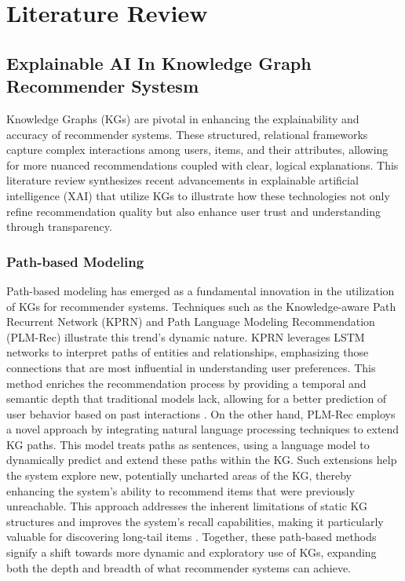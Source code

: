 \chapter{Literature Review}
\label{chap:literature_review}

\section{Explainable AI In Knowledge Graph Recommender Systesm}

Knowledge Graphs (KGs) are pivotal in enhancing the explainability and accuracy of
recommender systems. These structured, relational frameworks capture complex interactions
among users, items, and their attributes, allowing for more nuanced
recommendations coupled with clear, logical explanations. This literature review
synthesizes recent advancements in explainable artificial intelligence (XAI)
that utilize KGs to illustrate how these technologies not only refine
recommendation quality but also enhance user trust and understanding through
transparency.

\subsection{Path-based Modeling}

Path-based modeling has emerged as a fundamental innovation in the utilization of
KGs for recommender systems. Techniques such as the Knowledge-aware Path
Recurrent Network (KPRN) and Path Language Modeling Recommendation (PLM-Rec)
illustrate this trend's dynamic nature. KPRN leverages LSTM networks to interpret
paths of entities and relationships, emphasizing those connections that are most
influential in understanding user preferences. This method enriches the recommendation
process by providing a temporal and semantic depth that traditional models lack,
allowing for a better prediction of user behavior based on past interactions \parencite{wang_explainable_2019}. 
On the other hand, PLM-Rec employs a novel approach by
integrating natural language processing techniques to extend KG paths. This model
treats paths as sentences, using a language model to dynamically predict and
extend these paths within the KG. Such extensions help the system explore new,
potentially uncharted areas of the KG, thereby enhancing the system’s ability to
recommend items that were previously unreachable. This approach addresses the
inherent limitations of static KG structures and improves the system's recall
capabilities, making it particularly valuable for discovering long-tail items \parencite{geng_path_2022}. 
Together, these path-based methods signify a shift towards more dynamic
and exploratory use of KGs, expanding both the depth and breadth of what
recommender systems can achieve.


